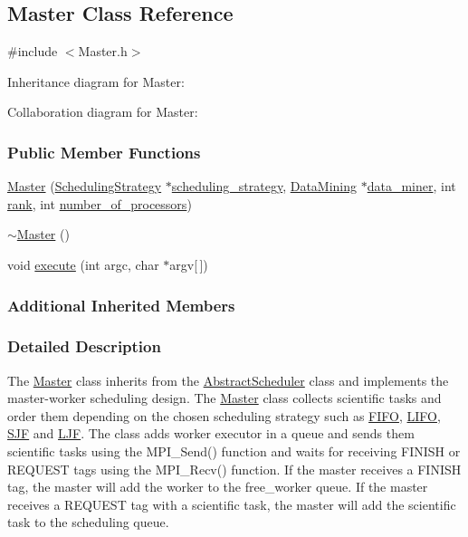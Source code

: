 \hypertarget{a00051}{}\subsection{Master Class Reference}
\label{a00051}


{\ttfamily \#include $<$Master.\+h$>$}



Inheritance diagram for Master\+:


Collaboration diagram for Master\+:
\subsubsection*{Public Member Functions}
\begin{DoxyCompactItemize}
\item 
\hyperlink{a00051_a4ffd1a0c99fc39712ac89c50f87dedfa}{Master} (\hyperlink{a00076}{Scheduling\+Strategy} $\ast$\hyperlink{a00005_a7dd11eee79bfb44c820d6c28480fd0c7}{scheduling\+\_\+strategy}, \hyperlink{a00021}{Data\+Mining} $\ast$\hyperlink{a00005_a6e281d90fa4b965779cd13eabf7d0249}{data\+\_\+miner}, int \hyperlink{a00027_a33c24e2887b4d9c4ef7f3566d3bc803e}{rank}, int \hyperlink{a00027_a4e798bde66d26fe200de7e8d2b54e915}{number\+\_\+of\+\_\+processors})
\item 
\hyperlink{a00051_a20f70958ed75532ba672af1b780f59eb}{$\sim$\+Master} ()
\item 
void \hyperlink{a00051_acea94dce898273bbbddfaae52f243bca}{execute} (int argc, char $\ast$argv\mbox{[}$\,$\mbox{]})
\end{DoxyCompactItemize}
\subsubsection*{Additional Inherited Members}


\subsubsection{Detailed Description}
The \hyperlink{a00051}{Master} class inherits from the \hyperlink{a00005}{Abstract\+Scheduler} class and implements the master-\/worker scheduling design. The \hyperlink{a00051}{Master} class collects scientific tasks and order them depending on the chosen scheduling strategy such as \hyperlink{a00028}{F\+I\+F\+O}, \hyperlink{a00038}{L\+I\+F\+O}, \hyperlink{a00080}{S\+J\+F} and \hyperlink{a00040}{L\+J\+F}. The class adds worker executor in a queue and sends them scientific tasks using the M\+P\+I\+\_\+\+Send() function and waits for receiving F\+I\+N\+I\+S\+H or R\+E\+Q\+U\+E\+S\+T tags using the M\+P\+I\+\_\+\+Recv() function. If the master receives a F\+I\+N\+I\+S\+H tag, the master will add the worker to the free\+\_\+worker queue. If the master receives a R\+E\+Q\+U\+E\+S\+T tag with a scientific task, the master will add the scientific task to the scheduling queue.

